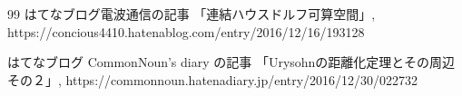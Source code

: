 \documentclass[leqno, a4paper, 12pt]{jsarticle}
\begin{document}
\renewcommand{\refname}{はてなブログ}
	
\begin{thebibliography}{99}
はてなブログ電波通信の記事
「連結ハウスドルフ可算空間」, 
https://concious4410.hatenablog.com/entry/2016/12/16/193128

はてなブログ CommonNoun's diary の記事
「Urysohnの距離化定理とその周辺 その２」, 
https://commonnoun.hatenadiary.jp/entry/2016/12/30/022732

\end{thebibliography}


\renewcommand{\refname}{参考文献}

\nocite{*}


\end{document}
